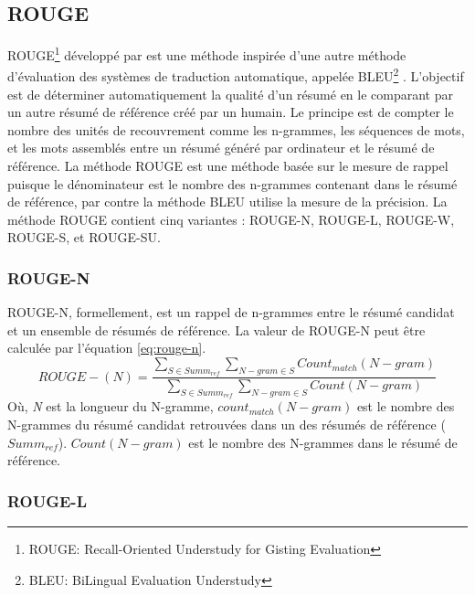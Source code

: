 \documentclass[a4paper,12pt,oneside]{../use/ESIthesis}
\begin{document}
\subsection{ROUGE}

ROUGE\footnote{ROUGE: Recall-Oriented Understudy for Gisting Evaluation} développé par \cite{03-Lin-hovy} est une méthode inspirée d'une autre méthode d'évaluation des systèmes de traduction automatique, appelée BLEU\footnote{BLEU: BiLingual Evaluation Understudy} \cite{02-papineni-al}. 
L'objectif est de déterminer automatiquement la qualité d'un résumé en le comparant par un autre résumé de référence créé par un humain. 
Le principe est de compter le nombre des unités de recouvrement comme les n-grammes, les séquences de mots, et les mots assemblés entre un résumé généré par ordinateur et le résumé de référence. 
La méthode ROUGE est une méthode basée sur le mesure de rappel puisque le dénominateur est le nombre des n-grammes contenant dans le résumé de référence, par contre la méthode BLEU utilise la mesure de la précision.
La méthode ROUGE contient cinq variantes \cite{04-lin}: ROUGE-N, ROUGE-L, ROUGE-W, ROUGE-S, et ROUGE-SU. 

\subsubsection{ROUGE-N}

ROUGE-N, formellement, est un rappel de n-grammes entre le résumé candidat et un ensemble de résumés de référence. 
La valeur de ROUGE-N peut être calculée par l'équation \ref{eq:rouge-n}. 
\begin{equation}
\label{eq:rouge-n}
ROUGE-(N) = \frac{\sum_{S \in Summ_{ref}}{\sum_{N-gram \in S}{Count_{match} (N-gram)}}}
{\sum_{S \in Summ_{ref}}{\sum_{N-gram \in S}{Count (N-gram)}}}
\end{equation}
Où, \textit{N} est la longueur du N-gramme, $count_{match}(N-gram)$ est le nombre des N-grammes du résumé candidat retrouvées dans un des résumés de référence ($Summ_{ref}$).
$Count (N-gram)$ est le nombre des N-grammes dans le résumé de référence. 

\subsubsection{ROUGE-L}
\end{document}
